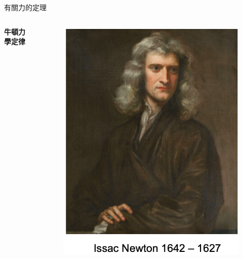 \documentclass[beamer=true]{standalone}
\begin{document}
\begin{frame}{有關力的定理}
    \begin{columns}
        \begin{center}
            {\LARGE\textbf{牛頓力學定律}}
        \end{center}

        \begin{figure}[h!]
            \centering
            \includegraphics[width=.75\textwidth]{assets/57b990b1.png}
        \end{figure}

    \end{columns}
\end{frame}
\end{document}
